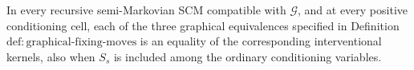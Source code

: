 In every recursive semi-Markovian SCM compatible with \(\mathcal G\), and at every positive conditioning cell, each of the three graphical equivalences specified in Definition \(\mathrm{def{:}graphical\text{-}fixing\text{-}moves}\) is an equality of the corresponding interventional kernels, also when \(S_s\) is included among the ordinary conditioning variables.